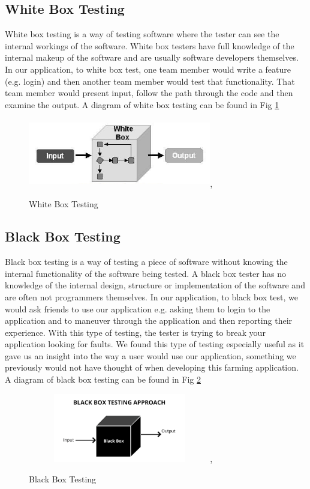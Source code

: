 \documentclass[12pt,a4paper,oneside,openany]{book}
\begin{document}
\subsection{White Box Testing}
White box testing is a way of testing software where the tester can see the internal workings of the software. White box testers have full knowledge of the internal makeup of the software and are usually software developers themselves. In our application, to white box test, one team member would write a feature (e.g. login) and then another team member would test that functionality. That team member would present input, follow the path through the code and then examine the output. A diagram of white box testing can be found in Fig \ref{white_box} \\
\begin{figure}[ht]
\renewcommand\thefigure{3.2}
\centering
\includegraphics[width=8cm, height=3cm]{Images/whitebox.jpg},
\caption{White Box Testing}
\label{white_box}
\end{figure}


\subsection{Black Box Testing}
Black box testing is a way of testing a piece of software without knowing the internal functionality of the software being tested. A black box tester has no knowledge of the internal design, structure or implementation of the software and are often not programmers themselves. In our application, to black box test, we would ask friends to use our application e.g. asking them to login to the application and to maneuver through the application and then reporting their experience. With this type of testing, the tester is trying to break your application looking for faults. We found this type of testing especially useful as it gave us an insight into the way a user would use our application, something we previously would not have thought of when developing this farming application. A diagram of black box testing can be found in Fig \ref{black_box} 

\begin{figure}[ht]
\renewcommand\thefigure{3.3}
\centering
\includegraphics[width=8cm, height=3cm]{Images/blackbox.png},
\caption{Black Box Testing}
\label{black_box}
\end{figure} 
\end{document}
